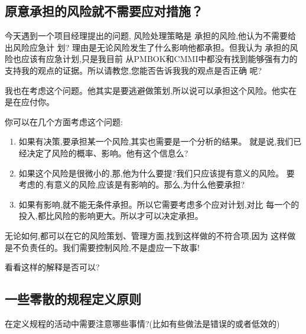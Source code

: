 \documentclass[11pt]{article}
\begin{document}
\subsection{原意承担的风险就不需要应对措施？}\label{link2}
\begin{staff}
  \qlogo 今天遇到一个项目经理提出的问题, 风险处理策略是 承担的风险,他认为不需要给出风险应急计
  划? 理由是无论风险发生了什么影响他都承担。但我认为 承担的风险也应该有应急计划,只是我目前
  从PMBOK和CMMI中都没有找到能够强有力的支持我的观点的证据。所以请教您,您能否告诉我我的观点是否正确
  呢?

\end{staff}

\begin{yang}
  \ylogo 我也在考虑这个问题。他其实是要逃避做策划,所以说可以承担这个风险。他实在是在应付你。

你可以在几个方面考虑这个问题:
\begin{enumerate}
  \item 如果有决策,要承担某一个风险,其实也需要是一个分析的结果。
   就是说,我们已经决定了风险的概率、影响。他有这个信息么?

  \item 如果这个风险是很微小的,那,他为什么要提?我们只应该提有意义的风险。
   要考虑的,有意义的风险,应该是有影响的。那么,为什么他要承担?

  \item 如果有影响,就不能无条件承担。所以它需要考虑多个应对计划,对比
   每一个的投入,都比风险的影响更大。所以才可以决定承担。
\end{enumerate}

无论如何,都可以在它的风险策划、管理方面,找到这样做的不符合项,因为
这样做是不负责任的。我们需要控制风险,不是虚应一下故事!

看看这样的解释是否可以?
\end{yang}

\subsection{一些零散的规程定义原则}
\qlogo \begin{staff}
在定义规程的活动中需要注意哪些事情?(比如有些做法是错误的或者低效的)
\end{staff}
\end{document}
